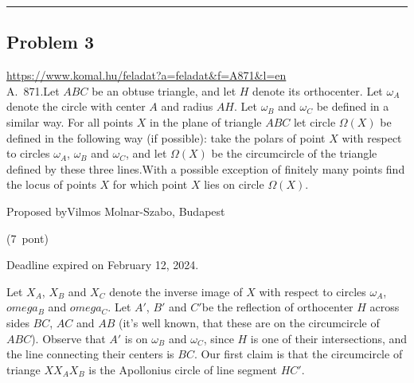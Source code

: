 \documentclass{article}
\begin{document}
\vspace{1em}
\hrule
\vspace{1em}

\subsection*{Problem 3}
\noindent\url{https://www.komal.hu/feladat?a=feladat&f=A871&l=en}\\[1em]

A. 871.Let \(\displaystyle ABC\) be an obtuse triangle, and let \(\displaystyle H\) denote its orthocenter. Let \(\displaystyle \omega_A\) denote the circle with center \(\displaystyle A\) and radius \(\displaystyle AH\). Let \(\displaystyle \omega_B\) and \(\displaystyle \omega_C\) be defined in a similar way. For all points \(\displaystyle X\) in the plane of triangle \(\displaystyle ABC\) let circle \(\displaystyle \Omega(X)\) be defined in the following way (if possible): take the polars of point \(\displaystyle X\) with respect to circles \(\displaystyle \omega_A\), \(\displaystyle \omega_B\) and \(\displaystyle \omega_C\), and let \(\displaystyle \Omega(X)\) be the circumcircle of the triangle defined by these three lines.With a possible exception of finitely many points find the locus of points \(\displaystyle X\) for which point \(\displaystyle X\) lies on circle \(\displaystyle \Omega(X)\).

Proposed byVilmos Molnar-Szabo, Budapest

(7 pont)

Deadline expired on February 12, 2024.

Let \(\displaystyle X_A\), \(\displaystyle X_B\) and \(\displaystyle X_C\) denote the inverse image of \(\displaystyle X\) with respect to circles \(\displaystyle \omega_A\), \(\displaystyle omega_B\) and \(\displaystyle omega_C\). Let \(\displaystyle A'\), \(\displaystyle B'\) and \(\displaystyle C'\)be the reflection of orthocenter \(\displaystyle H\) across sides \(\displaystyle BC\), \(\displaystyle AC\) and \(\displaystyle AB\) (it's well known, that these are on the circumcircle of \(\displaystyle ABC\)). Observe that \(\displaystyle A'\) is on \(\displaystyle \omega_B\) and \(\displaystyle \omega_C\), since \(\displaystyle H\) is one of their intersections, and the line connecting their centers is \(\displaystyle BC\). Our first claim is that the circumcircle of triange \(\displaystyle XX_AX_B\) is the Apollonius circle of line segment \(\displaystyle HC'\).
\end{document}
